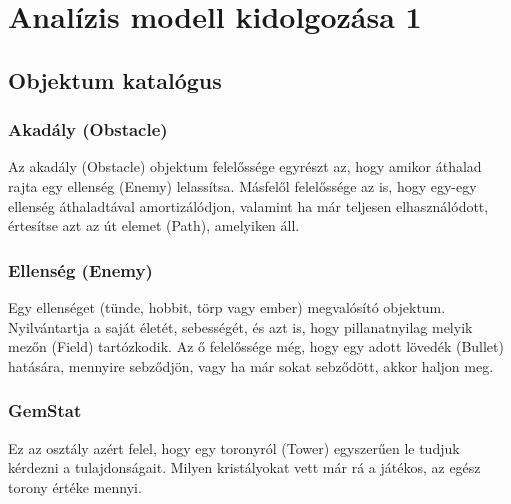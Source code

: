 %
\chapter{Analízis modell kidolgozása 1}

\thispagestyle{fancy}

\section{Objektum katalógus}


%



\subsection{Akadály (Obstacle)}
Az akadály (Obstacle) objektum felelőssége egyrészt az, hogy amikor áthalad rajta egy ellenség (Enemy) lelassítsa. Másfelől felelőssége az is, hogy egy-egy ellenség  áthaladtával amortizálódjon, valamint ha már teljesen elhasználódott, értesítse azt az út elemet (Path), amelyiken áll.
\subsection{Ellenség (Enemy)}
	Egy ellenséget (tünde, hobbit, törp vagy ember) megvalósító objektum. Nyilvántartja a saját életét, sebességét, és azt is, hogy pillanatnyilag melyik mezőn (Field) tartózkodik. Az ő felelőssége még, hogy egy adott lövedék (Bullet) hatására, mennyire sebződjön, vagy ha már sokat sebződött, akkor haljon meg.
\subsection{GemStat}
	Ez az osztály azért felel, hogy egy toronyról (Tower) egyszerűen le tudjuk kérdezni a tulajdonságait. Milyen kristályokat vett már rá a játékos, az egész torony értéke mennyi.
